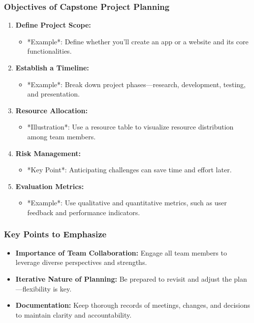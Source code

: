 \documentclass{beamer}
\begin{document}
\begin{frame}[fragile]
    \frametitle{Objectives of Capstone Project Planning}
    \begin{enumerate}
        \item \textbf{Define Project Scope:} 
            \begin{itemize}
                \item *Example*: Define whether you’ll create an app or a website and its core functionalities.
            \end{itemize}
        
        \item \textbf{Establish a Timeline:} 
            \begin{itemize}
                \item *Example*: Break down project phases—research, development, testing, and presentation.
            \end{itemize}

        \item \textbf{Resource Allocation:} 
            \begin{itemize}
                \item *Illustration*: Use a resource table to visualize resource distribution among team members.
            \end{itemize}

        \item \textbf{Risk Management:} 
            \begin{itemize}
                \item *Key Point*: Anticipating challenges can save time and effort later.
            \end{itemize}

        \item \textbf{Evaluation Metrics:} 
            \begin{itemize}
                \item *Example*: Use qualitative and quantitative metrics, such as user feedback and performance indicators.
            \end{itemize}
    \end{enumerate}
\end{frame}

\begin{frame}[fragile]
    \frametitle{Key Points to Emphasize}
    \begin{itemize}
        \item \textbf{Importance of Team Collaboration:} Engage all team members to leverage diverse perspectives and strengths.
        \item \textbf{Iterative Nature of Planning:} Be prepared to revisit and adjust the plan—flexibility is key.
        \item \textbf{Documentation:} Keep thorough records of meetings, changes, and decisions to maintain clarity and accountability.
    \end{itemize}
\end{frame}
\end{document}
